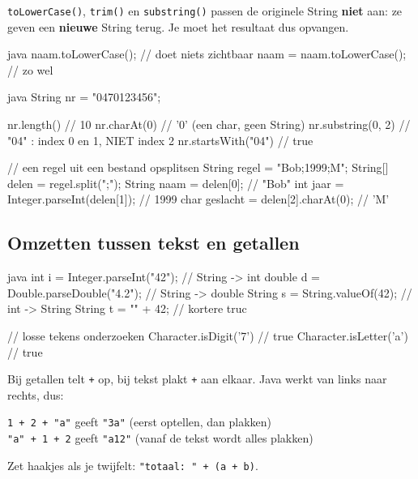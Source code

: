 \documentclass[a4paper,11pt]{article}
\begin{document}
\begin{warningbox}
    \texttt{toLowerCase()}, \texttt{trim()} en \texttt{substring()} passen de
    originele String \textbf{niet} aan: ze geven een \textbf{nieuwe} String terug. Je
    moet het resultaat dus opvangen.

    \begin{codeblock}{java}
        naam.toLowerCase();          // doet niets zichtbaar
        naam = naam.toLowerCase();   // zo wel
    \end{codeblock}
\end{warningbox}

\begin{codeblock}{java}
    String nr = "0470123456";

    nr.length()            // 10
    nr.charAt(0)           // '0'  (een char, geen String)
    nr.substring(0, 2)     // "04" : index 0 en 1, NIET index 2
    nr.startsWith("04")    // true

    // een regel uit een bestand opsplitsen
    String regel = "Bob;1999;M";
    String[] delen = regel.split(";");
    String naam = delen[0];                    // "Bob"
    int jaar = Integer.parseInt(delen[1]);     // 1999
    char geslacht = delen[2].charAt(0);        // 'M'
\end{codeblock}

\subsection{Omzetten tussen tekst en getallen}

\begin{codeblock}[omzetten]{java}
    int i = Integer.parseInt("42");        // String -> int
    double d = Double.parseDouble("4.2");  // String -> double
    String s = String.valueOf(42);         // int -> String
    String t = "" + 42;                    // kortere truc

    // losse tekens onderzoeken
    Character.isDigit('7')    // true
    Character.isLetter('a')   // true
\end{codeblock}

\begin{warningbox}
    Bij getallen telt \texttt{+} op, bij tekst plakt \texttt{+} aan elkaar. Java
    werkt van links naar rechts, dus:

    \medskip
    \texttt{1 + 2 + "a"} geeft \texttt{"3a"} (eerst optellen, dan plakken) \\
    \texttt{"a" + 1 + 2} geeft \texttt{"a12"} (vanaf de tekst wordt alles plakken)

    \medskip
    Zet haakjes als je twijfelt: \texttt{"totaal: " + (a + b)}.
\end{warningbox}
\end{document}
